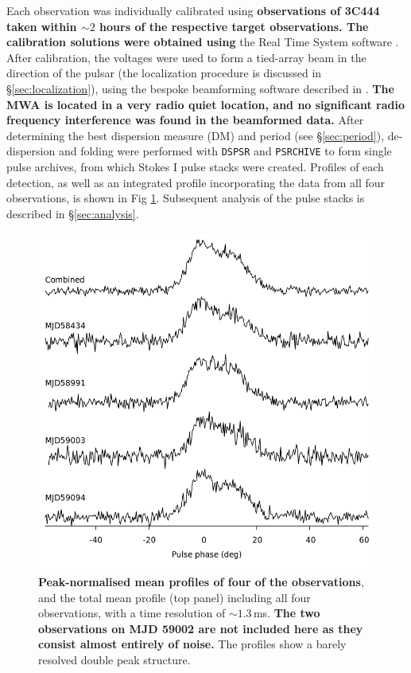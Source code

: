 \documentclass[linenumbers]{aastex631}
\begin{document}
Each observation was individually calibrated using {\bf observations of 3C444 taken within $\sim 2$ hours of the respective target observations.
The calibration solutions were obtained using} the Real Time System software \citep{Mitchell2008}.
After calibration, the voltages were used to form a tied-array beam in the direction of the pulsar (the localization procedure is discussed in \S\ref{sec:localization}), using the bespoke beamforming software described in \citet{Ord2019}.
{\bf The MWA is located in a very radio quiet location, and no significant radio frequency interference was found in the beamformed data.}
After determining the best dispersion measure (DM) and period (see \S\ref{sec:period}), de-dispersion and folding were performed with {\tt DSPSR} \citep{VanStraten2011b} and {\tt PSRCHIVE} \citep{Hotan2004} to form single pulse archives, from which Stokes I pulse stacks were created.
Profiles of each detection, as well as an integrated profile incorporating the data from all four observations, is shown in Fig \ref{fig:profiles}.
Subsequent analysis of the pulse stacks is described in \S\ref{sec:analysis}.
\begin{figure}[!th]
    \centering
    \includegraphics[width=\linewidth]{profiles.png}
    \caption{{\bf Peak-normalised mean profiles of four of the observations}, and the total mean profile (top panel) including all four observations, with a time resolution of $\sim 1.3\,$ms. {\bf The two observations on MJD 59002 are not included here as they consist almost entirely of noise.} The profiles show a barely resolved double peak structure.}
    \label{fig:profiles}
\end{figure}
\end{document}
